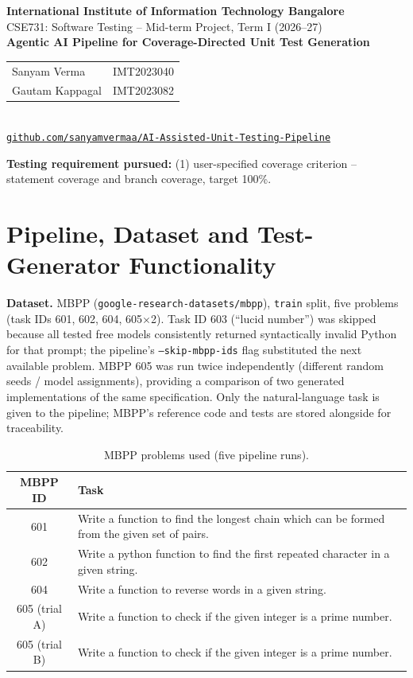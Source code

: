 \documentclass[11pt,a4paper]{article}
\begin{document}
\begin{center}
{\large\bfseries International Institute of Information Technology Bangalore}\\[2pt]
CSE731: Software Testing \;--\; Mid-term Project, Term I (2026--27)\\[10pt]
{\LARGE\bfseries Agentic AI Pipeline for Coverage-Directed Unit Test Generation}\\[10pt]
\begin{tabular}{ll}
Sanyam Verma & IMT2023040\\
Gautam Kappagal & IMT2023082
\end{tabular}\\[6pt]
\href{https://github.com/sanyamvermaa/AI-Assisted-Unit-Testing-Pipeline}{\texttt{github.com/sanyamvermaa/AI-Assisted-Unit-Testing-Pipeline}}
\end{center}

\noindent\textbf{Testing requirement pursued:} (1) user-specified coverage criterion --
statement coverage and branch coverage, target 100\%.

\section{Pipeline, Dataset and Test-Generator Functionality}

\textbf{Dataset.} MBPP (\texttt{google-research-datasets/mbpp}), \texttt{train} split,
five problems (task IDs 601, 602, 604, 605$\times$2). Task ID 603 (``lucid number'')
was skipped because all tested free models consistently returned syntactically invalid
Python for that prompt; the pipeline's \texttt{--skip-mbpp-ids} flag substituted the
next available problem. MBPP 605 was run twice independently (different random
seeds / model assignments), providing a comparison of two generated implementations of
the same specification. Only the natural-language task is given to the pipeline; MBPP's
reference code and tests are stored alongside for traceability.

\begin{table}[H]
\centering\small
\begin{tabularx}{\linewidth}{c X}
\toprule
MBPP ID & Task\\
\midrule
601 & Write a function to find the longest chain which can be formed from the given set of pairs.\\
602 & Write a python function to find the first repeated character in a given string.\\
604 & Write a function to reverse words in a given string.\\
605 (trial A) & Write a function to check if the given integer is a prime number.\\
605 (trial B) & Write a function to check if the given integer is a prime number.\\
\bottomrule
\end{tabularx}
\caption{MBPP problems used (five pipeline runs).}
\end{table}
\end{document}
